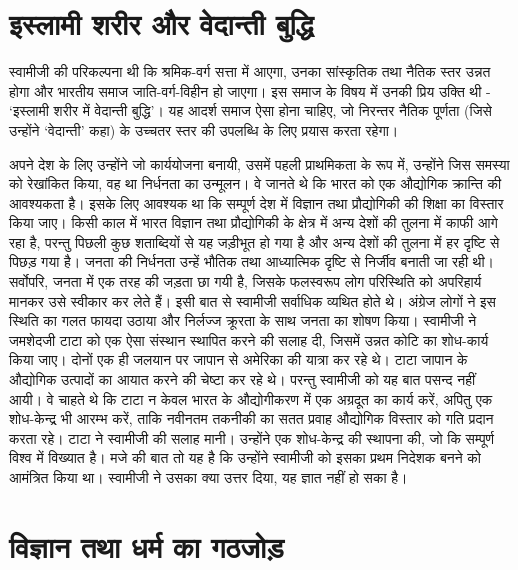 \section*{इस्लामी शरीर और वेदान्ती बुद्धि}

स्वामीजी की परिकल्पना थी कि श्रमिक-वर्ग सत्ता में आएगा, उनका सांस्कृतिक तथा नैतिक स्तर उन्नत होगा और भारतीय समाज जाति-वर्ग-विहीन हो जाएगा। इस समाज के विषय में उनकी प्रिय उक्ति थी - ‘इस्लामी शरीर में वेदान्ती बुद्धि’। यह आदर्श समाज ऐसा होना चाहिए, जो निरन्तर नैतिक पूर्णता (जिसे उन्होंने ‘वेदान्ती’ कहा) के उच्चतर स्तर की उपलब्धि के लिए प्रयास करता रहेगा। 

अपने देश के लिए उन्होंने जो कार्ययोजना बनायी, उसमें पहली प्राथमिकता के रूप में, उन्होंने जिस समस्या को रेखांकित किया, वह था निर्धनता का उन्मूलन। वे जानते थे कि भारत को एक औद्योगिक क्रान्ति की आवश्यकता है। इसके लिए आवश्यक था कि सम्पूर्ण देश में विज्ञान तथा प्रौद्योगिकी की शिक्षा का विस्तार किया जाए। किसी काल में भारत विज्ञान तथा प्रौद्योगिकी के क्षेत्र में अन्य देशों की तुलना में काफी आगे रहा है, परन्तु पिछली कुछ शताब्दियों से यह जड़ीभूत हो गया है और अन्य देशों की तुलना में हर दृष्टि से पिछड़ गया है। जनता की निर्धनता उन्हें भौतिक तथा आध्यात्मिक दृष्टि से निर्जीव बनाती जा रही थी। सर्वोपरि, जनता में एक तरह की जड़ता छा गयी है, जिसके फलस्वरूप लोग परिस्थिति को अपरिहार्य मानकर उसे स्वीकार कर लेते हैं। इसी बात से स्वामीजी सर्वाधिक व्यथित होते थे। अंग्रेज लोगों ने इस स्थिति का गलत फायदा उठाया और निर्लज्ज क्रूरता के साथ जनता का शोषण किया। स्वामीजी ने जमशेदजी टाटा को एक ऐसा संस्थान स्थापित करने की सलाह दी, जिसमें उन्नत कोटि का शोध-कार्य किया जाए। दोनों एक ही जलयान पर जापान से अमेरिका की यात्रा कर रहे थे। टाटा जापान के औद्योगिक उत्पादों का आयात करने की चेष्टा कर रहे थे। परन्तु स्वामीजी को यह बात पसन्द नहीं आयी। वे चाहते थे कि टाटा न केवल भारत के औद्योगीकरण में एक अग्रदूत का कार्य करें, अपितु एक शोध-केन्द्र भी आरम्भ करें, ताकि नवीनतम तकनीकी का सतत प्रवाह औद्योगिक विस्तार को गति प्रदान करता रहे। टाटा ने स्वामीजी की सलाह मानी। उन्होंने एक शोध-केन्द्र की स्थापना की, जो कि सम्पूर्ण विश्व में विख्यात है। मजे की बात तो यह है कि उन्होंने स्वामीजी को इसका प्रथम निदेशक बनने को आमंत्रित किया था। स्वामीजी ने उसका क्या उत्तर दिया, यह ज्ञात नहीं हो सका है।


\section*{विज्ञान तथा धर्म का गठजोड़}

